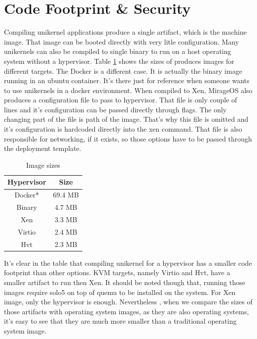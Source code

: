 \section{Code Footprint \& Security}
Compiling unikernel applications produce a single artifact, which is the machine image. That image can be booted directly with very litle configuration. Many unikernels can also be compiled to single binary to run on a host operating system without a hypervisor. Table \ref{tab:sizes} shows the sizes of produces images for different targets. The Docker is a different case. It is actually the binary image running in an ubuntu container. It's there just for reference when someone wants to use unikernels in a docker environment. When compiled to Xen, MirageOS also produces a configuration file to pass to hypervisor. That file is only couple of lines and it's configuration can be passed directly through flags. The only changing part of the file is path of the image. That's why this file is omitted and it's configuration is hardcoded directly into the xen command. That file is also responsible for networking, if it exists, so those options have to be passed through the deployment template.


\begin{table}[htpb]
  \caption[Image Sizes]{Image sizes}\label{tab:sizes}
  \centering
  \begin{tabular}{ |c|c| }
    \toprule
      Hypervisor & Size \\
    \midrule
    Docker* & 69.4 MB \\
     
      \hline
      Binary & 4.7 MB \\
    \hline
    Xen &  3.3 MB\\
    \hline
    Virtio & 2.4 MB \\
    \hline
      Hvt & 2.3 MB\\
    \bottomrule
  \end{tabular}
\end{table}


It's clear in the table that compiling unikernel for a hypervisor has a smaller code footprint than other options. KVM targets, namely Virtio and Hvt, have a smaller artifact to run then Xen. It should be noted though that, running those images require solo5 on top of quemu to be installed on the system. For Xen image, only the hypervisor is enough. Nevertheless , when we compare the sizes of those artifacts with operating system images, as they are also operating systems, it's easy to see that they are much more smaller than a traditional operating system image. 

